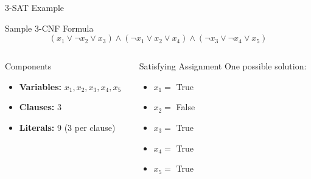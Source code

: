 \documentclass{beamer}
\begin{document}
\begin{frame}{3-SAT Example}
    \begin{exampleblock}{Sample 3-CNF Formula}
        \[
        (x_1 \lor \neg x_2 \lor x_3) \land (\neg x_1 \lor x_2 \lor x_4) \land (\neg x_3 \lor \neg x_4 \lor x_5)
        \]
    \end{exampleblock}
    
    \begin{columns}[T]
        \begin{column}{0.5\textwidth}
            \begin{block}{Components}
                \begin{itemize}
                    \item \textbf{Variables:} $x_1, x_2, x_3, x_4, x_5$
                    \item \textbf{Clauses:} 3
                    \item \textbf{Literals:} 9 (3 per clause)
                \end{itemize}
            \end{block}
        \end{column}
        
        \begin{column}{0.5\textwidth}
            \begin{alertblock}{Satisfying Assignment}
                One possible solution:
                \begin{itemize}
                    \item $x_1 =$ True
                    \item $x_2 =$ False
                    \item $x_3 =$ True
                    \item $x_4 =$ True
                    \item $x_5 =$ True
                \end{itemize}
            \end{alertblock}
        \end{column}
    \end{columns}
\end{frame}
\end{document}
